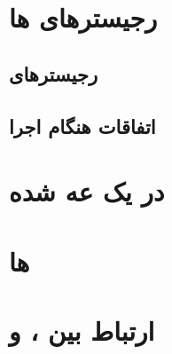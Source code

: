 \documentclass[11pt, dvipsnames, svgnames, x11names]{article}
\begin{document}
\section{رجیستر‌های ها}
\subsection{رجیستر‌های }
\subsection{اتفاقات هنگام اجرا}
\section{ در یک  عه  شده}
\section{ها}
\section{ارتباط بین ،  و }
\end{document}

